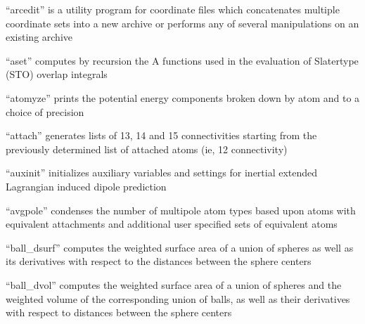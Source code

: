 \documentclass[letterpaper,11pt,english]{sphinxmanual}
\begin{document}
\sphinxAtStartPar
{}

\sphinxAtStartPar
{}

\sphinxAtStartPar
{}

\sphinxAtStartPar
“arcedit” is a utility program for coordinate files which concatenates multiple coordinate sets into a new archive or performs any of several manipulations on an existing archive

\sphinxAtStartPar
{}

\sphinxAtStartPar
“aset” computes by recursion the A functions used in the evaluation of Slater\sphinxhyphen{}type (STO) overlap integrals

\sphinxAtStartPar
{}

\sphinxAtStartPar
“atomyze” prints the potential energy components broken down by atom and to a choice of precision

\sphinxAtStartPar
{}

\sphinxAtStartPar
“attach” generates lists of 1\sphinxhyphen{}3, 1\sphinxhyphen{}4 and 1\sphinxhyphen{}5 connectivities starting from the previously determined list of attached atoms (ie, 1\sphinxhyphen{}2 connectivity)

\sphinxAtStartPar
{}

\sphinxAtStartPar
“auxinit” initializes auxiliary variables and settings for inertial extended Lagrangian induced dipole prediction

\sphinxAtStartPar
{}

\sphinxAtStartPar
“avgpole” condenses the number of multipole atom types based upon atoms with equivalent attachments and additional user specified sets of equivalent atoms

\sphinxAtStartPar
{}

\sphinxAtStartPar
“ball\_dsurf” computes the weighted surface area of a union of spheres as well as its derivatives with respect to the distances between the sphere centers

\sphinxAtStartPar
{}

\sphinxAtStartPar
“ball\_dvol” computes the weighted surface area of a union of spheres and the weighted volume of the corresponding union of balls, as well as their derivatives with respect to distances between the sphere centers
\end{document}

